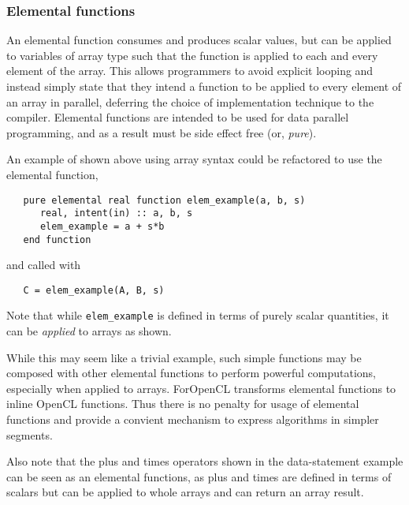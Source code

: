 \documentclass[10pt, conference, compsocconf]{IEEEtran}
\begin{document}
\subsubsection*{Elemental functions}

An elemental function consumes and produces scalar values, but can be applied
to variables of array type such that the function is applied to each and every
element of the array.  This allows programmers to avoid explicit looping and
instead simply state that they intend a function to be applied to every
element of an array in parallel, deferring the choice of implementation
technique to the compiler.  Elemental functions are intended to be used for
data parallel programming, and as a result must be side effect free (or,
\emph{pure}).


An example of shown above using array syntax could be refactored to use
the elemental function,

\begin{verbatim}
   pure elemental real function elem_example(a, b, s)
      real, intent(in) :: a, b, s
      elem_example = a + s*b
   end function
\end{verbatim}

and called with

\begin{verbatim}
   C = elem_example(A, B, s)
\end{verbatim}

Note that while {\tt elem_example} is defined in terms of purely scalar
quantities, it can be \emph{applied} to arrays as shown.

While this may seem like a trivial example, such simple functions may be
composed with other elemental functions to perform powerful computations,
especially when applied to arrays.  ForOpenCL transforms elemental functions to inline OpenCL
functions.  Thus there is no penalty for usage of elemental functions and provide
a convient mechanism to express algorithms in simpler segments.

Also note that the plus and times operators shown in the data-statement
example can be seen as an elemental functions, as plus and times are defined
in terms of scalars but can be applied to whole arrays and can return an array
result.
\end{document}
